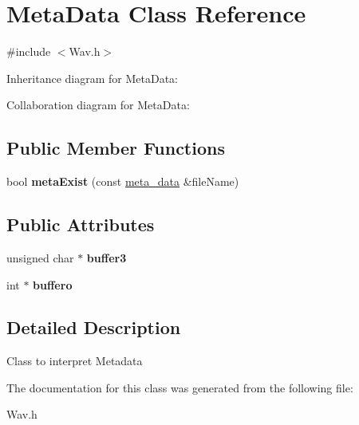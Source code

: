 \hypertarget{classMetaData}{}\section{Meta\+Data Class Reference}
\label{classMetaData}


{\ttfamily \#include $<$Wav.\+h$>$}



Inheritance diagram for Meta\+Data\+:


Collaboration diagram for Meta\+Data\+:
\subsection*{Public Member Functions}
\begin{DoxyCompactItemize}
\item 
\mbox{\label{classMetaData_a42853d4e6b1aa11685637372411c8add}} 
bool {\bfseries meta\+Exist} (const \hyperlink{structmeta__data}{meta\+\_\+data} \&file\+Name)
\end{DoxyCompactItemize}
\subsection*{Public Attributes}
\begin{DoxyCompactItemize}
\item 
\mbox{\label{classMetaData_a351b64073c00d1f543704f299b19cbdc}} 
unsigned char $\ast$ {\bfseries buffer3}
\item 
\mbox{\label{classMetaData_aa0a8f3924418552af7007faa36a079ef}} 
int $\ast$ {\bfseries buffero}
\end{DoxyCompactItemize}


\subsection{Detailed Description}
Class to interpret Metadata 

The documentation for this class was generated from the following file\+:\begin{DoxyCompactItemize}
\item 
Wav.\+h\end{DoxyCompactItemize}
